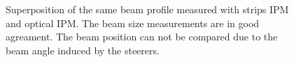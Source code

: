 \begin{figure}[!ht]
	\begin{center}
		
	\end{center}
	\caption[Superposition of the same beam profile measured with strips IPM and optical IPM]{Superposition of the same beam profile measured with strips IPM and optical IPM. The beam size measurements are in good agreament. The beam position can not be compared due to the beam angle induced by the steerers.}
	\label{chap4:MCP_strip}
\end{figure}
